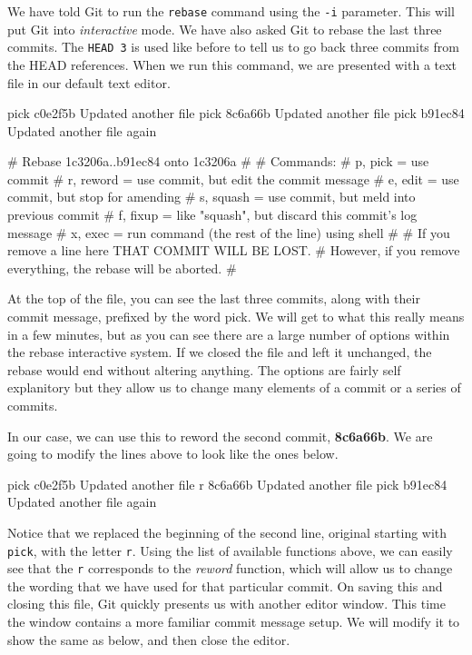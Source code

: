 
We have told Git to run the \texttt{rebase} command using the \texttt{-i} parameter.
This will put Git into \emph{interactive} mode.
We have also asked Git to rebase the last three commits.
The \texttt{HEAD~3} is used like before to tell us to go back three commits from the HEAD references.
When we run this command, we are presented with a text file in our default text editor.

\begin{code}
pick c0e2f5b Updated another file
pick 8c6a66b Updated another file
pick b91ec84 Updated another file again

# Rebase 1c3206a..b91ec84 onto 1c3206a
#
# Commands:
#  p, pick = use commit
#  r, reword = use commit, but edit the commit message
#  e, edit = use commit, but stop for amending
#  s, squash = use commit, but meld into previous commit
#  f, fixup = like "squash", but discard this commit's log message
#  x, exec = run command (the rest of the line) using shell
#
# If you remove a line here THAT COMMIT WILL BE LOST.
# However, if you remove everything, the rebase will be aborted.
#
\end{code}

At the top of the file, you can see the last three commits, along with their commit message, prefixed by the word pick.
We will get to what this really means in a few minutes, but as you can see there are a large number of options within the rebase interactive system.
If we closed the file and left it unchanged, the rebase would end without altering anything.
The options are fairly self explanitory but they allow us to change many elements of a commit or a series of commits.

In our case, we can use this to reword the second commit, \textbf{8c6a66b}.
We are going to modify the lines above to look like the ones below.

\begin{code}
pick c0e2f5b Updated another file
r 8c6a66b Updated another file
pick b91ec84 Updated another file again
\end{code}

Notice that we replaced the beginning of the second line, original starting with \texttt{pick}, with the letter \texttt{r}.
Using the list of available functions above, we can easily see that the \texttt{r} corresponds to the \emph{reword} function, which will allow us to change the wording that we have used for that particular commit.
On saving this and closing this file, Git quickly presents us with another editor window.
This time the window contains a more familiar commit message setup.
We will modify it to show the same as below, and then close the editor.

